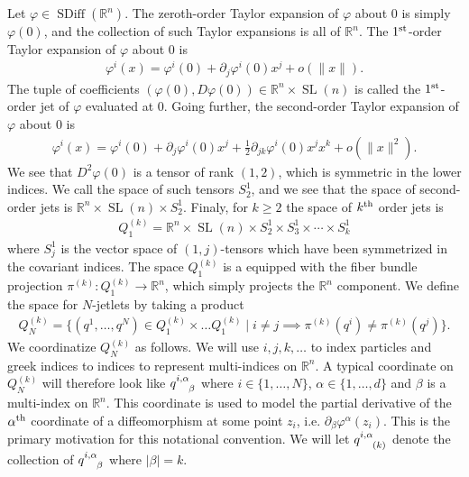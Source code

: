 \documentclass[12pt]{amsart}
\newcommand{\R}{\ensuremath{\mathbb{R}}}
\DeclareMathOperator{\SDiff}{SDiff}
\DeclareMathOperator{\SL}{SL}
\begin{document}
  Let $\varphi \in \SDiff(\R^n)$.
  The zeroth-order Taylor expansion of $\varphi$ about $0$
  is simply $\varphi(0)$, and the collection of such Taylor
  expansions is all of $\R^n$.
  The $1^{\rm st}$-order Taylor expansion of $\varphi$ about $0$ is
  \begin{align*}
    \varphi^i( x) = \varphi^i(0) + \partial_j \varphi^i(0) x^j + o( \|x\|).
  \end{align*}
  The tuple of coefficients $(\varphi(0) , D\varphi(0) ) \in \R^n \times \SL(n)$ is
  called the $1^{\rm st}$-order jet of $\varphi$ evaluated at $0$.
  Going further, the second-order Taylor expansion of $\varphi$ about $0$
  is
  \begin{align*}
    \varphi^i(x) = \varphi^i(0) + \partial_j \varphi^i(0) x^j + 
    \frac{1}{2} \partial_{jk} \varphi^i(0) x^j x^k + o( \| x\|^2).
  \end{align*}
  We see that $D^2\varphi(0)$ is a tensor of rank $(1,2)$, which is
  symmetric in the lower indices.
  We call the space of such tensors $S^1_2$,
  and we see that the space of second-order jets is $\R^n \times \SL(n) \times S^1_2$.
  Finaly, for $k \geq 2$ the space of $k^{\rm th}$ order jets is
  \begin{align*}
    Q_1^{(k)} = \R^n \times \SL(n) \times S^1_2 \times S^1_3 \times \cdots\times S^1_k
  \end{align*}
  where $S^1_j$ is the vector space of $(1,j)$-tensors which
  have been symmetrized in the covariant indices.
  The space $Q_1^{(k)}$ is a equipped with the fiber bundle
  projection $\pi^{(k)} : Q_1^{(k)} \to \R^n$,
  which simply projects the $\R^n$ component.
  We define the space for $N$-jetlets by taking a product
  \begin{align*}
    Q^{(k)}_N = \{ (q^1,\dots, q^N) \in Q_1^{(k)} \times \dots Q_1^{(k)}
    \mid i \neq j \implies \pi^{(k)}( q^i) \neq \pi^{(k)}( q^j) \}.
  \end{align*}
  We coordinatize $Q^{(k)}_N$ as follows.
  We will use $i,j,k,\dots$ to index particles and greek indices to indices to represent
  multi-indices on $\R^n$.  A typical coordinate on $Q^{(k)}_N$ will therefore look
  like $q\indices{^{i,\alpha}_{\beta}}$ where $i \in \{1,\dots,N\}$, $\alpha \in \{ 1 , \dots, d \}$
  and $\beta$ is a multi-index on $\R^n$.
  This coordinate is used to model the partial derivative of the $\alpha^{\rm th}$ coordinate
  of a diffeomorphism at some point $z_i$, i.e. $\partial_\beta \varphi^\alpha(z_i)$.
  This is the primary motivation for this notational convention.
  We will let $q \indices{^{i,\alpha}_{(k)}}$ denote the collection of $q\indices{^{i,\alpha}_\beta}$
  where $| \beta | = k$.
\end{document}
